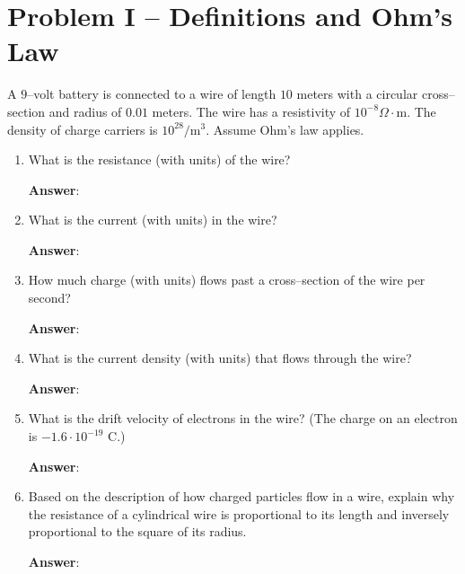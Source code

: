 \documentclass{article}
\begin{document}
\newpage

\section{Problem I -- Definitions and Ohm's Law}

A $9$--volt battery is connected to a wire of length $10$ meters with a circular cross--section and radius of $0.01$ meters. The wire has a resistivity of $10^{-8}\Omega\cdot\text{m}$. The density of charge carriers is $10^{28}/\text{m}^3$. Assume Ohm's law applies.

\begin{enumerate}

  \item What is the resistance (with units) of the wire?

        \ifsolutions
        \textbf{Answer}:
        \else
        \vskip 84pt
        \fi

  \item What is the current (with units) in the wire?

        \ifsolutions
        \textbf{Answer}:
        \else
        \vskip 84pt
        \fi

  \item How much charge (with units) flows past a cross--section of the wire per second?

        \ifsolutions
        \textbf{Answer}:
        \else
        \vskip 84pt
        \fi

  \item What is the current density (with units) that flows through the wire?

        \ifsolutions
        \textbf{Answer}:
        \else
        \vskip 84pt
        \fi

  \item What is the drift velocity of electrons in the wire? (The charge on an electron is $-1.6·10^{-19}\text{ C}$.)

        \ifsolutions
        \textbf{Answer}:
        \else
        \vskip 84pt
        \fi

  \item Based on the description of how charged particles flow in a wire, explain why the resistance of a cylindrical wire is proportional to its length and inversely proportional to the square of its radius.

        \ifsolutions
        \textbf{Answer}:
        \else

        \fi

\end{enumerate}
\end{document}
